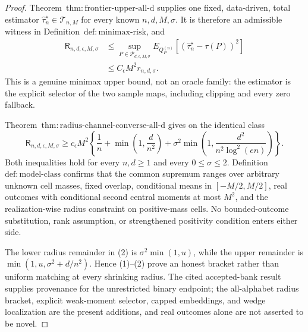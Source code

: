 \documentclass{article}
\begin{document}
\begin{proof}
Theorem~\(\mathrm{thm:frontier\text{-}upper\text{-}all\text{-}d}\) supplies one fixed, data-driven, total estimator \(\widehat\tau_n^{\star}\in\mathcal T_{n,M}\) for every known \(n,d,M,\sigma\).  It is therefore an admissible witness in Definition~\(\mathrm{def:minimax\text{-}risk}\), and
\[
\begin{aligned}
 \mathsf R_{n,d,\epsilon,M,\sigma}
 &\le \sup_{P\in\mathcal P_{d,\epsilon,M,\sigma}}
 E_{Q_P^{(n)}}[(\widehat\tau_n^{\star}-\tau(P))^2]\\
 &\le C_{\epsilon}M^2r_{n,d,\sigma}.
\end{aligned}
\tag{1}
\]
This is a genuine minimax upper bound, not an oracle family: the estimator is the explicit selector of the two sample maps, including clipping and every zero fallback.

Theorem~\(\mathrm{thm:radius\text{-}channel\text{-}converse\text{-}all\text{-}d}\) gives on the identical class
\[
 \mathsf R_{n,d,\epsilon,M,\sigma}
 \ge c_{\epsilon}M^2\left\{\frac1n+\min\left(1,\frac d{n^2}\right)
 +\sigma^2\min\left(1,\frac{d^2}{n^2\log^2(en)}\right)\right\}.
\tag{2}
\]
Both inequalities hold for every \(n,d\ge1\) and every \(0\le\sigma\le2\).  Definition~\(\mathrm{def:model\text{-}class}\) confirms that the common supremum ranges over arbitrary unknown cell masses, fixed overlap, conditional means in \([-M/2,M/2]\), real outcomes with conditional second central moments at most \(M^2\), and the realization-wise radius constraint on positive-mass cells.  No bounded-outcome substitution, rank assumption, or strengthened positivity condition enters either side.

The lower radius remainder in (2) is \(\sigma^2\min(1,u)\), while the upper remainder is \(\min(1,u,\sigma^2+d/n^2)\).  Hence (1)--(2) prove an honest bracket rather than uniform matching at every shrinking radius.  The cited accepted-bank result supplies provenance for the unrestricted binary endpoint; the all-alphabet radius bracket, explicit weak-moment selector, capped embeddings, and wedge localization are the present additions, and real outcomes alone are not asserted to be novel.
\end{proof}
\end{document}
